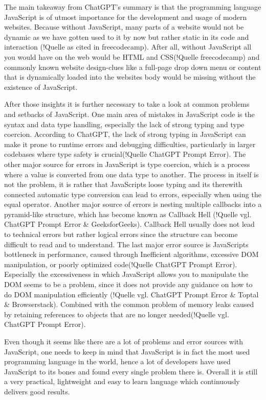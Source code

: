 The main takeaway from ChatGPT's summary is that the programming language JavaScript is of utmost importance for the development and usage of modern websites. Because without JavaScript, many parts of a website would not be dynamic as we have gotten used to it by now but rather static in its code and interaction (!Quelle as cited in freecodecamp). After all, without JavaScript \dq all you would have on the web would be HTML and CSS\dq (!Quelle freecodecamp) and commonly known website design-clues like a full-page drop down menu or content that is dynamically loaded into the websites body would be missing without the existence of JavaScript.

After those insights it is further necessary to take a look at common problems and setbacks of JavaScript. One main area of mistakes in JavaScript code is the syntax and data type handling, especially the lack of strong typing and type coercion. According to ChatGPT, the lack of strong typing in JavaScript \dq can make it prone to runtime errors and debugging difficulties, particularly in larger codebases where type safety is crucial\dq (!Quelle ChatGPT Prompt Error). The other major source for errors in JavaScript is type coercion, which is a process where a value is converted from one data type to another. The process in itself is not the problem, it is rather that JavaScripts loose typing and its therewith connected automatic type conversion can lead to errors, especially when using the equal operator.
Another major source of errors is nesting multiple callbacks into a pyramid-like structure, which has become known as Callback Hell (!Quelle vgl. ChatGPT Prompt Error \& GeeksforGeeks). Callback Hell usually does not lead to technical errors but rather logical errors since the structure can become difficult to read and to understand. 
The last major error source is JavaScripts bottleneck in performance, caused through \dq Inefficient algorithms, excessive DOM manipulation, or poorly optimized code\dq (!Quelle ChatGPT Prompt Error). Especially the excessiveness in which JavaScript allows you to manipulate the DOM seems to be a problem, since it does not provide any guidance on how to do DOM manipulation efficiently (!Quelle vgl. ChatGPT Prompt Error \& Toptal \& Browserstack). Combined with the common problem of memory leaks caused by \dq retaining references to objects that are no longer needed\dq (!Quelle vgl. ChatGPT Prompt Error).

Even though it seems like there are a lot of problems and error sources with JavaScript, one needs to keep in mind that JavaScript is in fact the most used programming language in the world, hence a lot of developers have used JavaScript to its bones and found every single problem there is. Overall it is still a very practical, lightweight and easy to learn language which continuously delivers good results.